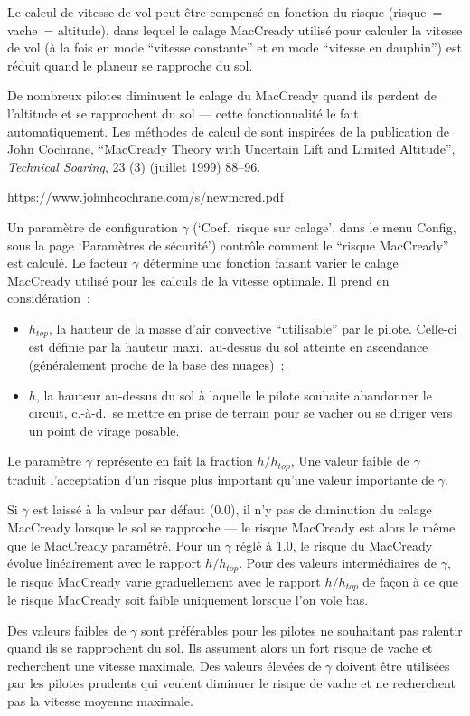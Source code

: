 Le calcul de vitesse de vol peut être compensé en fonction du risque (risque~= vache~= altitude), dans lequel le calage MacCready utilisé pour calculer la vitesse de vol (à la fois en mode ``vitesse constante'' et en mode ``vitesse en dauphin'') est réduit quand le planeur se rapproche du sol.

De nombreux pilotes diminuent le calage du MacCready quand ils perdent de l'altitude et se rapprochent du sol --- cette fonctionnalité le fait automatiquement.
Les méthodes de calcul de \xc{} sont inspirées de la publication de John Cochrane, ``MacCready Theory with Uncertain Lift and Limited Altitude'', \emph{Technical Soaring}, 23 (3) (juillet 1999) 88--96.

\url{https://www.johnhcochrane.com/s/newmcred.pdf}

Un paramètre de configuration $\gamma$ (`Coef.\ risque sur calage', dans le menu Config, sous la page `Paramètres de sécurité') contrôle comment le ``risque MacCready'' est calculé.
Le facteur $\gamma$ détermine une fonction faisant varier le calage MacCready utilisé pour les calculs de la vitesse optimale.
Il prend en considération~:
\begin{itemize}
\item $h_{top}$, la hauteur de la masse d'air convective ``utilisable'' par le pilote.
Celle-ci est définie par la hauteur maxi.\ au-dessus du sol atteinte en ascendance (généralement proche de la base des nuages)~;
\item $h$, la hauteur au-dessus du sol à laquelle le pilote souhaite abandonner le circuit, c.-à-d.\ se mettre en prise de terrain pour se vacher ou se diriger vers un point de virage posable.
\end{itemize}
Le paramètre $\gamma$ représente en fait la fraction $h/h_{top}$, Une valeur faible de $\gamma$ traduit l'acceptation d'un risque plus important qu'une valeur importante de $\gamma$.

Si $\gamma$ est laissé à la valeur par défaut (0.0), il n'y pas de diminution du calage MacCready lorsque le sol se rapproche --- le risque MacCready est alors le même que le MacCready paramétré.
Pour un $\gamma$ réglé à 1.0, le risque du MacCready évolue linéairement avec le rapport $h/h_{top}$.
Pour des valeurs intermédiaires de $\gamma$, le risque MacCready varie graduellement avec le rapport $h/h_{top}$ de façon à ce que le risque MacCready soit faible uniquement lorsque l'on vole bas.

Des valeurs faibles de $\gamma$ sont préférables pour les pilotes ne souhaitant pas ralentir quand ils se rapprochent du sol.
Ils assument alors un fort risque de vache et recherchent une vitesse maximale.
Des valeurs élevées de $\gamma$ doivent être utilisées par les pilotes prudents qui veulent diminuer le risque de vache et ne recherchent pas la vitesse moyenne maximale.

